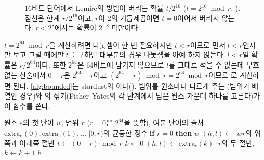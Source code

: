 \begin{figure}[htbp]
\centering
{}
\caption{$16$비트 단어에서 Lemire의 방법이 버리는 확률 $t/2^{16}$ ($t=2^{16}\bmod r$, ). 점선은 한계 $r/2^{16}$이고, $r$이 $2$의 거듭제곱이면 $t=0$이어서 버리지 않는다. $r<2^8$에서는 확률이 $2^{-8}$ 미만이다.}
\label{fig:lemire}
\end{figure}

$t=2^{64}\bmod r$을 계산하려면 나눗셈이 한 번 필요하지만 $t<r$이므로 먼저 $l<r$인지만 보고 그럴 때에만 $t$를 구하면 대부분의 경우 나눗셈을 아예 하지 않는다. $l<r$일 확률은 $r/2^{64}$이다. 또한 $2^{64}$은 64비트에 담기지 않으므로 $t$를 그대로 적을 수 없는데 부호 없는 산술에서 $0-r$은 $2^{64}-r$이고 $(2^{64}-r)\bmod r=2^{64}\bmod r$이므로 로 계산하면 된다. \cref{alg:bounded}는 stardust의 이다(). 범위를 원소마다 다르게 주는 (범위가 배열인 경우)와 의 섞기(Fisher–Yates의 각 단계에서 남은 원소 가운데 하나를 고른다)가 이 함수를 쓴다.

\begin{algorithm}[htbp]
\begin{algorithmic}[1]
\Require 원소 $e$의 첫 단어 $w$, 범위 $r$ ($r=0$은 $2^{64}$을 뜻함), 여분 단어의 출처 $\mathrm{extra}_e(0),\mathrm{extra}_e(1),\dots$
\Ensure $[0,r)$의 균등한 정수
\State \textbf{if} $r=0$ \textbf{then} \Return $w$
\State $(h,l)\gets$ $wr$의 위쪽과 아래쪽 절반 
 
  \State $t\gets(0-r)\bmod r$ 
  \State $k\gets0$
   
    \State $(h,l)\gets\mathrm{extra}_e(k)\cdot r$의 두 절반, $k\gets k+1$
  \EndWhile
\EndIf
\State \Return $h$
\end{algorithmic}
\caption{범위의 균등한 정수 (stardust )}
\label{alg:bounded}
\end{algorithm}

